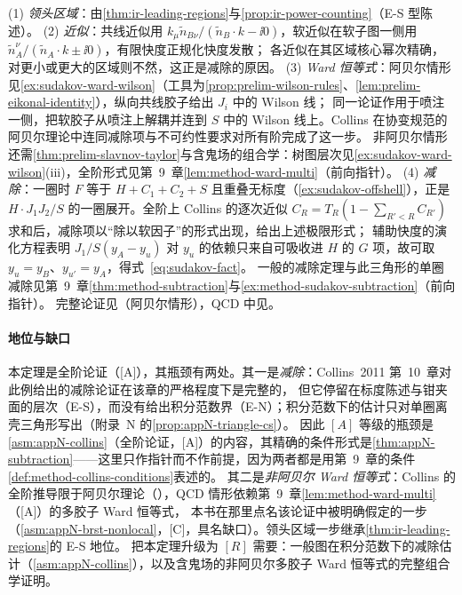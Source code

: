 \begin{proofsketch}
(1) \emph{领头区域}：由\cref{thm:ir-leading-regions}与\cref{prop:ir-power-counting}（E-S 型陈述）。
(2) \emph{近似}：共线近似用 $k_\mu\tilde n_{B\nu}/(\tilde n_B\cdot k-\ii0)$，软近似在软子图一侧用 $\tilde n_A^\nu/(\tilde n_A\cdot k\pm\ii0)$，有限快度正规化快度发散；
各近似在其区域核心幂次精确，对更小或更大的区域则不然，这正是减除的原因\cite[第~10.4、10.6~节]{Collins2011}。
(3) \emph{Ward 恒等式}：阿贝尔情形见\cref{ex:sudakov-ward-wilson}（工具为\cref{prop:prelim-wilson-rules}、\cref{lem:prelim-eikonal-identity}），纵向共线胶子给出 $J_i$ 中的 Wilson 线；
同一论证作用于喷注一侧，把软胶子从喷注上解耦并连到 $S$ 中的 Wilson 线上。Collins 在协变规范的阿贝尔理论中连同减除项与不可约性要求对所有阶完成了这一步\cite[第~10.8.3--10.8.5~节]{Collins2011}。
非阿贝尔情形还需\cref{thm:prelim-slavnov-taylor}与含鬼场的组合学：树图层次见\cref{ex:sudakov-ward-wilson}(iii)，全阶形式见第~9~章\cref{lem:method-ward-multi}（前向指针）。
(4) \emph{减除}：一圈时 $F$ 等于 $H+C_1+C_2+S$ 且重叠无标度（\cref{ex:sudakov-offshell}），正是 $H\cdot J_1J_2/S$ 的一圈展开。全阶上 Collins 的逐次近似
$C_R=T_R(1-\sum_{R'<R}C_{R'})$ 求和后，减除项以“除以软因子”的形式出现，给出上述极限形式\cite[式~(10.11)、(10.94)、(10.109)]{Collins2011}；
辅助快度的演化方程\cite[第~10.10~节]{Collins2011}表明 $J_1/S(y_A-y_u)$ 对 $y_u$ 的依赖只来自可吸收进 $H$ 的 $G$ 项，故可取 $y_u=y_B$、$y_{u'}=y_A$，得式~\eqref{eq:sudakov-fact}。
一般的减除定理与此三角形的单圈减除见第~9~章\cref{thm:method-subtraction}与\cref{ex:method-sudakov-subtraction}（前向指针）。
完整论证见\cite[第~10.3、10.8--10.10~节]{Collins2011}（阿贝尔情形），QCD 中见\cite{Mueller:1979ih,Collins:1980ih,Sen:1981sd,Collins:1989bt,Magnea:1990zb}。
\end{proofsketch}

\paragraph{地位与缺口}本定理是全阶论证（[A]），其瓶颈有两处。其一是\emph{减除}：Collins~2011 第~10~章对此例给出的减除论证在该章的严格程度下是完整的，
但它停留在标度陈述与钳夹面的层次（E-S），而没有给出积分范数界（E-N）；积分范数下的估计只对单圈离壳三角形写出（附录~N 的\cref{prop:appN-triangle-cs}）。
因此 $[A]$ 等级的瓶颈是\cref{asm:appN-collins}（全阶论证，[A]）的内容，其精确的条件形式是\cref{thm:appN-subtraction}——这里只作指针而不作前提，因为两者都是用第~9~章的条件\cref{def:method-collins-conditions}表述的。
其二是\emph{非阿贝尔 Ward 恒等式}：Collins 的全阶推导限于阿贝尔理论（\cite[第~10.8.3~节]{Collins2011}），QCD 情形依赖第~9~章\cref{lem:method-ward-multi}（[A]）的多胶子 Ward 恒等式，
本书在那里点名该论证中被明确假定的一步（\cref{asm:appN-brst-nonlocal}，[C]，具名缺口）。领头区域一步继承\cref{thm:ir-leading-regions}的 E-S 地位。
把本定理升级为 $[R]$ 需要：一般图在积分范数下的减除估计（\cref{asm:appN-collins}），以及含鬼场的非阿贝尔多胶子 Ward 恒等式的完整组合学证明。
